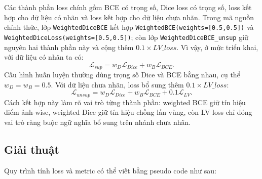 Các thành phần loss chính gồm BCE có trọng số, Dice loss có trọng số, loss kết hợp cho dữ liệu có nhãn và loss kết hợp cho dữ liệu chưa nhãn. Trong mã nguồn chính thức, lớp \texttt{WeightedDiceBCE} kết hợp \texttt{WeightedBCE(weights=[0.5,0.5])} và \texttt{WeightedDiceLoss(weights=[0.5,0.5])}; còn lớp \texttt{WeightedDiceBCE\_unsup} giữ nguyên hai thành phần này và cộng thêm \(0.1\times LV\_loss\). Vì vậy, ở mức triển khai, với dữ liệu có nhãn ta có:
\[
\mathcal{L}_{sup}
=w_D\mathcal{L}_{Dice}
+w_B\mathcal{L}_{BCE}.
\]
Cấu hình huấn luyện thường dùng trọng số Dice và BCE bằng nhau, cụ thể \(w_D=w_B=0.5\). Với dữ liệu chưa nhãn, loss bổ sung thêm \(0.1\times LV\_loss\):
\[
\mathcal{L}_{unsup}
=w_D\mathcal{L}_{Dice}
+w_B\mathcal{L}_{BCE}
+0.1\mathcal{L}_{LV}.
\]
Cách kết hợp này làm rõ vai trò từng thành phần: weighted BCE giữ tín hiệu điểm ảnh-wise, weighted Dice giữ tín hiệu chồng lấn vùng, còn LV loss chỉ đóng vai trò ràng buộc ngữ nghĩa bổ sung trên nhánh chưa nhãn.

\subsection*{Giải thuật}

Quy trình tính loss và metric có thể viết bằng pseudo code như sau:

